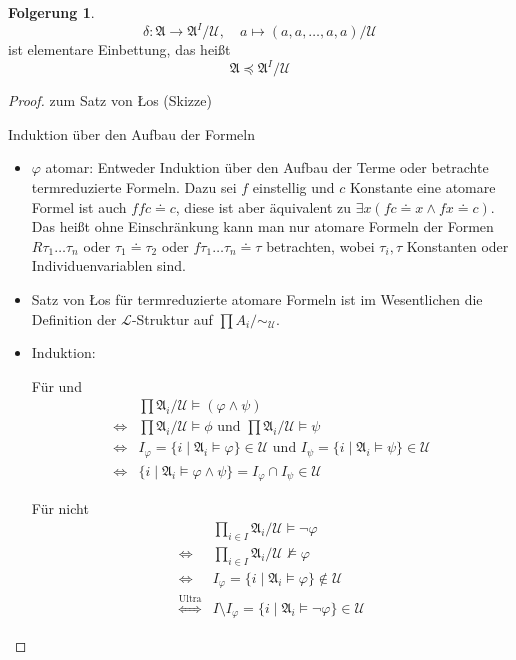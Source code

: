 \documentclass[12pt,parskip=full]{scrartcl}
\theoremstyle{definition}
\newtheorem{corollary}[theorem]{Folgerung}
\begin{document}
	\begin{corollary}
		\begin{equation*}
		 \delta: \mathfrak{A} \to \mathfrak{A}^I / \mathcal{U}, \quad a \mapsto (a,a, \dots, a,a)/ \mathcal{U}
		\end{equation*}
		ist elementare Einbettung, das heißt
		\begin{equation*}
			\mathfrak{A} \preccurlyeq \mathfrak{A}^I/\mathcal{U}
		\end{equation*}
	\end{corollary}

	\begin{proof} zum Satz von \L os (Skizze)
		
		Induktion über den Aufbau der Formeln
		
		\begin{itemize}
			\item $\varphi$ atomar: Entweder Induktion über den Aufbau der Terme oder betrachte termreduzierte Formeln. Dazu sei $f$ einstellig und $c$ Konstante eine atomare Formel ist auch $f f c \doteq c$, diese ist aber äquivalent zu $\exists x (f c \doteq x  \land f x \doteq c)$. Das heißt ohne Einschränkung kann man nur atomare Formeln der Formen $R \tau_1 \dots \tau_n$ oder $\tau_1 \doteq \tau_2$ oder $f \tau_1 \dots \tau_n \doteq \tau$ betrachten, wobei $\tau_i, \tau$ Konstanten oder Individuenvariablen sind.
			\item Satz von \L os für termreduzierte atomare Formeln ist im Wesentlichen die Definition der $\mathcal{L}$-Struktur auf $\prod A_i / \sim_\mathcal{U}$.
			\item Induktion:
			
			Für und
			\begin{align*}
				&\prod \mathfrak{A}_i / \mathcal{U} \models (\varphi \land \psi) \\
				\Leftrightarrow& \prod \mathfrak{A}_i / \mathcal{U} \models \phi \text{ und } \prod \mathfrak{A}_i / \mathcal{U} \models \psi \\
				\Leftrightarrow& I_\varphi = \{ i \mid \mathfrak{A}_i \models \varphi \} \in \mathcal{U} \text{ und } I_\psi = \{ i \mid \mathfrak{A}_i \models \psi\} \in \mathcal{U} \\
				\Leftrightarrow& \{ i \mid \mathfrak{A}_i \models \varphi \land \psi \} = I_\varphi \cap I_\psi \in \mathcal{U}
			\end{align*}
			
			Für nicht
			\begin{align*}
				&\prod_{i \in I} \mathfrak{A}_i / \mathcal{U} \models \lnot \varphi \\
				\Leftrightarrow& \prod_{i \in I} \mathfrak{A}_i / \mathcal{U} \not\models \varphi \\
				\Leftrightarrow& I_\varphi = \{ i \mid \mathfrak{A}_i \models \varphi \} \notin \mathcal{U} \\
				\overset{\text{Ultra}}{\Leftrightarrow}&  I \setminus I_\varphi = \{ i \mid \mathfrak{A}_i \models \lnot \varphi \} \in \mathcal{U}
			\end{align*}
			

\end{itemize}
\end{proof}
\end{document}
